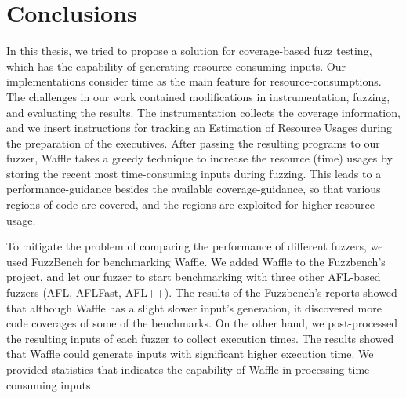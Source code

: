 \section{Conclusions}
\label{sec:conclusions}

In this thesis, we tried to propose a solution for coverage-based fuzz testing, which has the capability of generating resource-consuming inputs. Our implementations consider time as the main feature for resource-consumptions. The challenges in our work contained modifications in instrumentation, fuzzing, and evaluating the results. The instrumentation collects the coverage information, and we insert instructions for tracking an Estimation of Resource Usages during the preparation of the executives. After passing the resulting programs to our fuzzer, Waffle takes a greedy technique to increase the resource (time) usages by storing the recent most time-consuming inputs during fuzzing. This leads to a performance-guidance besides the available coverage-guidance, so that various regions of code are covered, and the regions are exploited for higher resource-usage.


To mitigate the problem of comparing the performance of different fuzzers, we used FuzzBench for benchmarking Waffle. We added Waffle to the Fuzzbench's project, and let our fuzzer to start benchmarking with three other AFL-based fuzzers (AFL, AFLFast, AFL++). The results of the Fuzzbench's reports showed that although Waffle has a slight slower input's generation, it discovered more code coverages of some of the benchmarks. On the other hand, we post-processed the resulting inputs of each fuzzer to collect execution times. The results showed that Waffle could generate inputs with significant higher execution time. We provided statistics that indicates the capability of Waffle in processing time-consuming inputs.